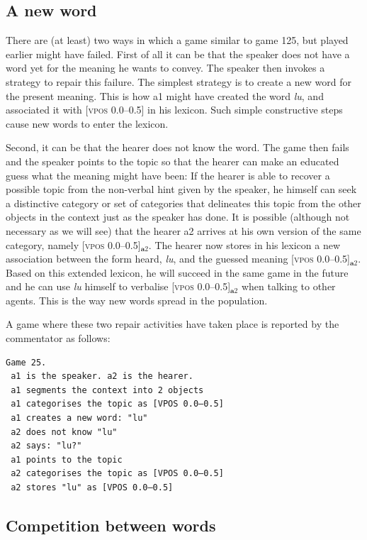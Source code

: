 \subsection{A new word}

There are (at least) two ways in which a game similar to game 125, 
but played earlier might have failed. First of all it can be that
the speaker does not have a word yet for the meaning he wants
to convey. The speaker then invokes a strategy 
to repair this failure. The simplest strategy is to 
create a new word for the present meaning. This is how 
{\bfshape a1} might have created the word \textit{lu}, and associated it 
with [\textsc{vpos} 0.0–0.5] in his lexicon. Such simple constructive steps cause
new words to enter the lexicon. 

Second, it can be that the hearer does not know the word. The 
game then fails and the speaker points to 
the topic so that the hearer can make 
an educated guess what the meaning might have been:
If the hearer is able to recover a possible topic
from the non-verbal hint given by the speaker, 
he himself can seek a distinctive category or set of categories 
that delineates this topic from the other objects in 
the context just as the speaker has done. It is 
possible (although not necessary as we will see)
that the hearer {\bfshape a2} arrives at his 
own version of the same category, namely [\textsc{vpos} 0.0–0.5]$_{\mathbf  a2}$. The 
hearer now stores in his lexicon a new association between the 
form heard, \textit{lu}, and the guessed meaning [\textsc{vpos} 0.0–0.5]$_{\mathbf  a2}$. 
Based on this extended lexicon, he will succeed in the same game 
in the future and he can use \textit{lu} himself to verbalise [\textsc{vpos} 0.0–0.5]$_{\mathbf  a2}$
when talking to other agents. This is the way new words
spread in the population.

A game where these two repair activities have taken
place is reported by the commentator as follows: 
\begin{verbatim}
Game 25.
 a1 is the speaker. a2 is the hearer. 
 a1 segments the context into 2 objects
 a1 categorises the topic as [VPOS 0.0–0.5]
 a1 creates a new word: "lu"
 a2 does not know "lu"
 a2 says: "lu?"
 a1 points to the topic 
 a2 categorises the topic as [VPOS 0.0–0.5]
 a2 stores "lu" as [VPOS 0.0–0.5]
\end{verbatim}

\subsection{Competition between words}

